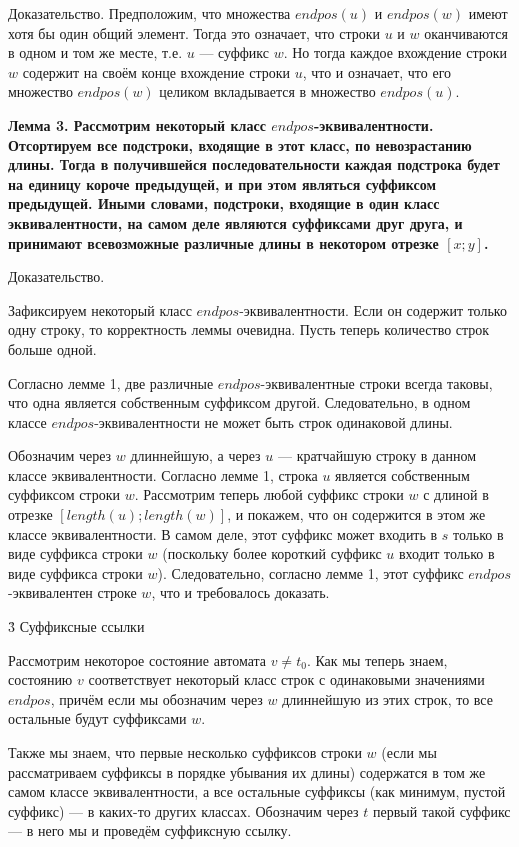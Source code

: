 Доказательство. Предположим, что множества $endpos(u)$ и $endpos(w)$ имеют хотя бы один общий элемент. Тогда это означает, что строки $u$ и $w$ оканчиваются в одном и том же месте, т.е. $u$ --- суффикс $w$. Но тогда каждое вхождение строки $w$ содержит на своём конце вхождение строки $u$, что и означает, что его множество $endpos(w)$ целиком вкладывается в множество $endpos(u)$.

\bf{Лемма 3}. Рассмотрим некоторый класс $endpos$-эквивалентности. Отсортируем все подстроки, входящие в этот класс, по невозрастанию длины. Тогда в получившейся последовательности каждая подстрока будет на единицу короче предыдущей, и при этом являться суффиксом предыдущей. Иными словами, \bf{подстроки, входящие в один класс эквивалентности, на самом деле являются суффиксами друг друга, и принимают всевозможные различные длины в некотором отрезке $[x;y]$}.

Доказательство.

Зафиксируем некоторый класс $endpos$-эквивалентности. Если он содержит только одну строку, то корректность леммы очевидна. Пусть теперь количество строк больше одной.

Согласно лемме 1, две различные $endpos$-эквивалентные строки всегда таковы, что одна является собственным суффиксом другой. Следовательно, в одном классе $endpos$-эквивалентности не может быть строк одинаковой длины.

Обозначим через $w$ длиннейшую, а через $u$ --- кратчайшую строку в данном классе эквивалентности. Согласно лемме 1, строка $u$ является собственным суффиксом строки $w$. Рассмотрим теперь любой суффикс строки $w$ с длиной в отрезке $[length(u); length(w)]$, и покажем, что он содержится в этом же классе эквивалентности. В самом деле, этот суффикс может входить в $s$ только в виде суффикса строки $w$ (поскольку более короткий суффикс $u$ входит только в виде суффикса строки $w$). Следовательно, согласно лемме 1, этот суффикс $endpos$-эквивалентен строке $w$, что и требовалось доказать.


\h3{ Суффиксные ссылки }

Рассмотрим некоторое состояние автомата $v \ne t_0$. Как мы теперь знаем, состоянию $v$ соответствует некоторый класс строк с одинаковыми значениями $endpos$, причём если мы обозначим через $w$ длиннейшую из этих строк, то все остальные будут суффиксами $w$.

Также мы знаем, что первые несколько суффиксов строки $w$ (если мы рассматриваем суффиксы в порядке убывания их длины) содержатся в том же самом классе эквивалентности, а все остальные суффиксы (как минимум, пустой суффикс) --- в каких-то других классах. Обозначим через $t$ первый такой суффикс --- в него мы и проведём суффиксную ссылку.

